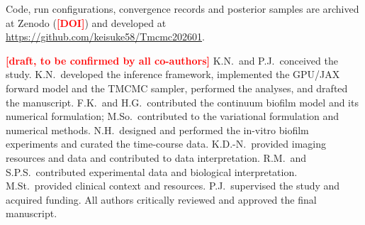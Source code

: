 \documentclass[pdflatex,sn-mathphys-ay,lineno]{sn-jnl}%
\newcommand{\TBD}[1]{\textcolor{red}{\textbf{[#1]}}}
\begin{document}
Code, run configurations, convergence records and posterior samples are archived at Zenodo (\TBD{DOI}) and developed at \url{https://github.com/keisuke58/Tmcmc202601}.

\TBD{draft, to be confirmed by all co-authors}
K.N.\ and P.J.\ conceived the study.
K.N.\ developed the inference framework, implemented the GPU/JAX forward model and the TMCMC sampler, performed the analyses, and drafted the manuscript.
F.K.\ and H.G.\ contributed the continuum biofilm model and its numerical formulation; M.So.\ contributed to the variational formulation and numerical methods.
N.H.\ designed and performed the in-vitro biofilm experiments and curated the time-course data.
K.D.-N.\ provided imaging resources and data and contributed to data interpretation.
R.M.\ and S.P.S.\ contributed experimental data and biological interpretation.
M.St.\ provided clinical context and resources.
P.J.\ supervised the study and acquired funding.
All authors critically reviewed and approved the final manuscript.




\end{document}
